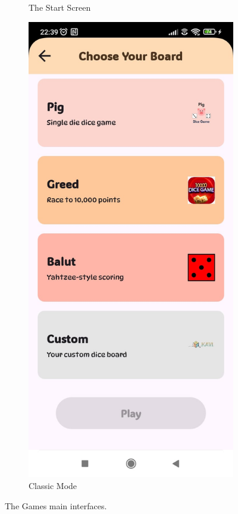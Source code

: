 \begin{figure}[h]
\begin{subfigure}[b]{0.27\textwidth}
        \caption{The Start Screen}
        \label{fig:start_screen}
    \end{subfigure}
    \hfill
    \begin{subfigure}[b]{0.27\textwidth}
        \includegraphics[width=\textwidth]{img/classic boards.jpg}
        \caption{Classic Mode}
        \label{fig:board_screen}
    \end{subfigure}
\caption{The Games main interfaces.}
\label{fig:interface_mode}
\end{figure}

